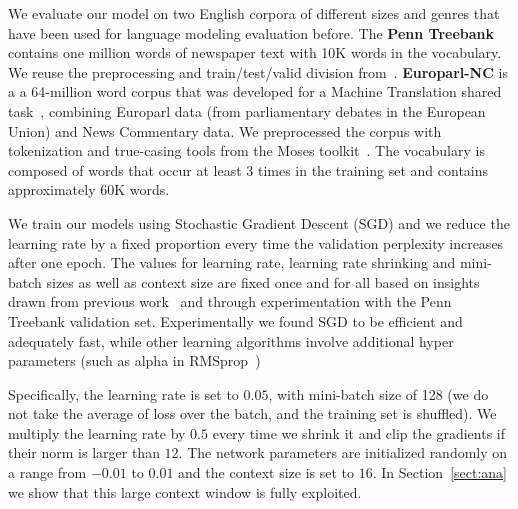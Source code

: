 We evaluate our model on two English corpora of different sizes and
genres that have been used for language modeling evaluation
before. The {\bf Penn Treebank} contains one million words of
newspaper text with 10K words in the vocabulary. We reuse the
preprocessing and train/test/valid division
from~\cite{mikolov2014learning}. 
{\bf Europarl-NC} is a a 64-million word corpus that was developed for
a Machine Translation shared task~\cite{bojar-EtAl:2015:WMT},
combining Europarl data (from parliamentary debates in the European
Union) and News Commentary data.  We preprocessed the corpus with
tokenization and true-casing tools from the Moses
toolkit~\cite{koehn2007moses}. The vocabulary is composed of words
that occur at least 3 times in the training set and contains
approximately 60K words. %

We train our models using Stochastic Gradient Descent (SGD) and we
reduce the learning rate by a fixed proportion every time the
validation perplexity increases after one epoch. The values for learning rate,
learning rate shrinking 
and mini-batch sizes as well as context size are
fixed once and for all based on insights drawn from previous
work~\cite{le2011structured,sukhbaatar2015end,devlin2014fast} and
through experimentation with the Penn Treebank validation set. Experimentally we found SGD to be efficient and adequately fast, while other learning algorithms involve additional hyper parameters (such as alpha in RMSprop~\cite{tieleman2012lecture})

Specifically, the learning rate is set to $0.05$, with mini-batch size
of 128 (we do not take the average of loss over the batch, and the
training set is shuffled). We multiply the learning rate by $0.5$
every time we shrink it and clip the gradients if their norm is larger
than $12$. The network parameters are initialized randomly on a range
from $-0.01$ to $0.01$ and the context size is set to $16$. In
Section~\ref{sect:ana} we show that this large context window is fully
exploited. 

